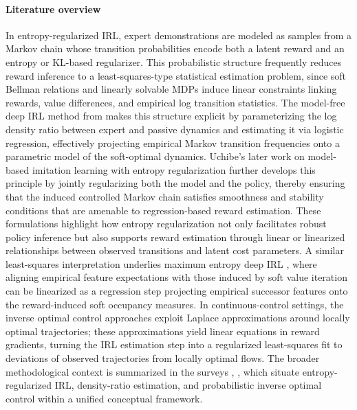 \documentclass{article}
\theoremstyle{definition}
\theoremstyle{remark}
\theoremstyle{plain}
\numberwithin{equation}{section}
\begin{document}
\paragraph{Literature overview}
In entropy-regularized IRL, expert demonstrations are modeled as samples from a Markov chain whose transition probabilities encode both a latent reward and an entropy or KL-based regularizer.  This probabilistic structure frequently reduces reward inference to a least-squares-type statistical estimation problem, since soft Bellman relations and linearly solvable MDPs induce linear constraints linking rewards, value differences, and empirical log transition statistics. The  model-free deep IRL method from \cite{Uchibe2018} makes this structure explicit by parameterizing the log density ratio between expert and passive dynamics and estimating it via logistic regression, effectively projecting empirical Markov transition frequencies onto a parametric model of the soft-optimal dynamics. Uchibe's later work on model-based imitation learning with entropy regularization \cite{Uchibe2022} further develops this principle by jointly regularizing both the model and the policy, thereby ensuring that the induced controlled Markov chain satisfies smoothness and stability conditions that are amenable to regression-based reward estimation. These formulations highlight how entropy regularization not only facilitates robust policy inference but also supports reward estimation through linear or linearized relationships between observed transitions and latent cost parameters. A similar least-squares interpretation underlies maximum entropy deep IRL \cite{Wulfmeier2015}, where aligning empirical feature expectations with those induced by soft value iteration can be linearized as a regression step projecting empirical successor features onto the reward-induced soft occupancy measures. In continuous-control settings, the inverse optimal control approaches \cite{Levine2016} exploit Laplace approximations around locally optimal trajectories; these approximations yield linear equations in reward gradients, turning the IRL estimation step into a regularized least-squares fit to deviations of observed trajectories from locally optimal flows. The broader methodological context is summarized in the surveys \cite{ARORA2021103500},  \cite{AdamsCodyBelingSurvey}, which situate entropy-regularized IRL, density-ratio estimation, and probabilistic inverse optimal control within a unified conceptual framework. 
\end{document}
